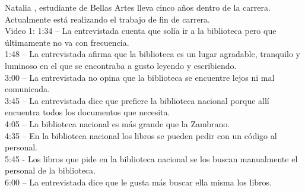 \documentclass[12pt]{article}
\begin{document}
Natalia , estudiante de Bellas Artes lleva cinco años dentro de la carrera.\\ Actualmente está realizando el trabajo de fin de carrera.\\ 
Video 1: 
1:34 – La entrevistada cuenta que solía ir a la biblioteca pero que últimamente no va con frecuencia.\\ 
1:48 – La entrevistada afirma que la biblioteca es un lugar agradable, tranquilo y luminoso en el que se encontraba a gusto leyendo y escribiendo.\\
3:00 – La entrevistada no opina que la biblioteca se encuentre lejos ni mal comunicada.\\ 
3:45 – La entrevistada dice que prefiere la biblioteca nacional porque allí encuentra todos los documentos que necesita.\\ 
4:05 – La biblioteca nacional es más grande que la Zambrano.\\ 
4:35 – En la biblioteca nacional los libros se pueden pedir con un código al personal.\\ 
5:45 -  Los libros que pide en la biblioteca nacional se los buscan manualmente el personal de la biblioteca.\\
6:00 – La entrevistada dice que le gusta más buscar ella misma los libros.\\
\end{document}
